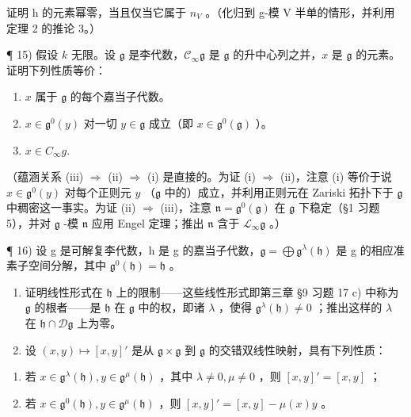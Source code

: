 证明 h 的元素幂零，当且仅当它属于 \(n_{V}\) 。（化归到 g-模 V 半单的情形，并利用定理 2 的推论 3。）

¶ 15) 假设 \(k\) 无限。设 \(\mathfrak{g}\) 是李代数，\(\mathcal{C}_{\infty}\mathfrak{g}\) 是 \(\mathfrak{g}\) 的升中心列之并，\(x\) 是 \(\mathfrak{g}\) 的元素。证明下列性质等价：

\begin{enumerate}
\def\labelenumi{(\roman{enumi})}
\item
  \(x\) 属于 \(\mathfrak{g}\) 的每个嘉当子代数。
\item
  \(x\in \mathfrak{g}^0 (y)\) 对一切 \(y\in \mathfrak{g}\) 成立（即 \(x\in \mathfrak{g}^0 (\mathfrak{g})\) ）。
\item
  \(x \in C_{\infty}g.\)
\end{enumerate}

（蕴涵关系 (iii) \(\Longrightarrow\) (ii) \(\Longrightarrow\) (i) 是直接的。为证 (i) \(\Longrightarrow\) (ii)，注意 (i) 等价于说 \(x\in \mathfrak{g}^0 (y)\) 对每个正则元 \(y\) （\(\mathfrak{g}\) 中的）成立，并利用正则元在 Zariski 拓扑下于 \(\mathfrak{g}\) 中稠密这一事实。为证 (ii) \(\Longrightarrow\) (iii)，注意 \(\mathfrak{n} = \mathfrak{g}^0 (\mathfrak{g})\) 在 \(\mathfrak{g}\) 下稳定（§1 习题 5），并对 \(\mathfrak{g}\) -模 \(\mathfrak{n}\) 应用 Engel 定理；推出 \(\mathfrak{n}\) 含于 \(\mathcal{L}_{\infty}\mathfrak{g}\) 。）

¶ 16) 设 g 是可解复李代数，h 是 g 的嘉当子代数，\(\mathfrak{g} = \bigoplus \mathfrak{g}^{\lambda}(\mathfrak{h})\) 是 g 的相应准素子空间分解，其中 \(\mathfrak{g}^{0}(\mathfrak{h}) = \mathfrak{h}\) 。

\begin{enumerate}
\def\labelenumi{\alph{enumi})}
\item
  证明线性形式在 \(\mathfrak{h}\) 上的限制——这些线性形式即第三章 §9 习题 17 c) 中称为 \(\mathfrak{g}\) 的根者——是 \(\mathfrak{h}\) 在 \(\mathfrak{g}\) 中的权，即诸 \(\lambda\) ，使得 \(\mathfrak{g}^{\lambda}(\mathfrak{h}) \neq 0\) ；推出这样的 \(\lambda\) 在 \(\mathfrak{h} \cap \mathcal{D}\mathfrak{g}\) 上为零。
\item
  设 \((x,y)\mapsto [x,y]'\) 是从 \(\mathfrak{g}\times \mathfrak{g}\) 到 \(\mathfrak{g}\) 的交错双线性映射，具有下列性质：
\end{enumerate}

\begin{enumerate}
\def\labelenumi{(\roman{enumi})}
\item
  若 \(x \in \mathfrak{g}^{\lambda}(\mathfrak{h}), y \in \mathfrak{g}^{\mu}(\mathfrak{h})\) ，其中 \(\lambda \neq 0, \mu \neq 0\) ，则 \([x, y]' = [x, y]\) ；
\item
  若 \(x \in \mathfrak{g}^{0}(\mathfrak{h}), y \in \mathfrak{g}^{\mu}(\mathfrak{h})\) ，则 \([x, y]' = [x, y] - \mu(x)y\) 。
\end{enumerate}

